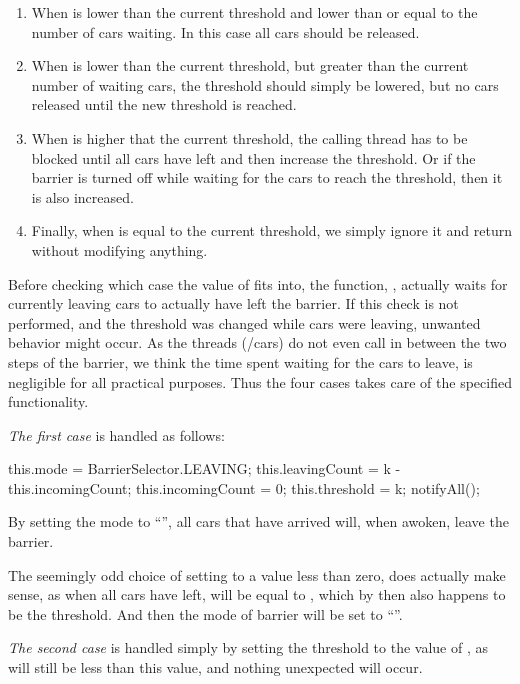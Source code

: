 \begin{enumerate}
\item When  is lower than the current threshold and lower than
  or equal to the number of cars waiting. In this case all cars should
  be released.
\item When  is lower than the current threshold, but greater
  than the current number of waiting cars, the threshold should simply
  be lowered, but no cars released until the new threshold is reached.
\item When  is higher that the current threshold, the calling
  thread has to be blocked until all cars have left and then increase
  the threshold. Or if the barrier is turned off while waiting for the
  cars to reach the threshold, then it is also increased.
\item Finally, when  is equal to the current threshold, we
  simply ignore it and return without modifying anything.
\end{enumerate}

Before checking which case the value of  fits into, the
function, , actually waits for currently leaving
cars to actually have left the barrier. If this check is not
performed, and the threshold was changed while cars were leaving,
unwanted behavior might occur. As the threads (/cars) do not even call
 in between the two steps of the barrier, we think the
time spent waiting for the cars to leave, is negligible for all
practical purposes. Thus the four cases takes care of the specified
functionality.

\emph{The first case} is handled as follows:
\begin{java}
this.mode = BarrierSelector.LEAVING;
this.leavingCount = k - this.incomingCount;
this.incomingCount = 0;
this.threshold = k;
notifyAll();
\end{java}

By setting the mode to ``'', all cars that have arrived
will, when awoken, leave the barrier.

The seemingly odd choice of setting  to a value
less than zero, does actually make sense, as when all cars have left,
 will be equal to , which by then also
happens to be the threshold. And then the mode of barrier will be set
to ``''.

\emph{The second case} is handled simply by setting the threshold to
the value of , as  will still be less than
this value, and nothing unexpected will occur.

